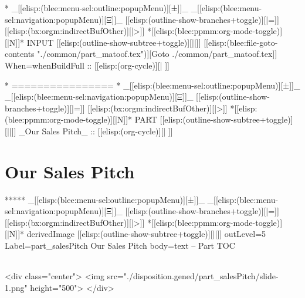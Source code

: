 \begin{whenOrg}
\begin{whenOrg}
*  _[[elisp:(blee:menu-sel:outline:popupMenu)][±]]_ _[[elisp:(blee:menu-sel:navigation:popupMenu)][Ξ]]_ [[elisp:(outline-show-branches+toggle)][|=]] [[elisp:(bx:orgm:indirectBufOther)][|>]] *[[elisp:(blee:ppmm:org-mode-toggle)][|N]]*  INPUT      [[elisp:(outline-show-subtree+toggle)][||]]   [[elisp:(blee:file-goto-contents "./common/part_matoof.tex")][Goto ./common/part_matoof.tex]] When=whenBuildFull ::  [[elisp:(org-cycle)][| ]]
\end{whenOrg}
\begin{whenBuildFull}

\end{whenBuildFull}


\begin{whenOrg}
*      ================
*  _[[elisp:(blee:menu-sel:outline:popupMenu)][±]]_ _[[elisp:(blee:menu-sel:navigation:popupMenu)][Ξ]]_ [[elisp:(outline-show-branches+toggle)][|=]] [[elisp:(bx:orgm:indirectBufOther)][|>]] *[[elisp:(blee:ppmm:org-mode-toggle)][|N]]*  PART       [[elisp:(outline-show-subtree+toggle)][||]]   _Our Sales Pitch_ ::  [[elisp:(org-cycle)][| ]]
\end{whenOrg}

\newpage
\part{Our Sales Pitch}


\begin{whenOrg}
*****  _[[elisp:(blee:menu-sel:outline:popupMenu)][±]]_ _[[elisp:(blee:menu-sel:navigation:popupMenu)][Ξ]]_ [[elisp:(outline-show-branches+toggle)][|=]] [[elisp:(bx:orgm:indirectBufOther)][|>]] *[[elisp:(blee:ppmm:org-mode-toggle)][|N]]*  derivedImage [[elisp:(outline-show-subtree+toggle)][||]] outLevel=5 Label=part_salesPitch Our Sales Pitch body=text -- Part TOC
\end{whenOrg}

\begin{htmlonly}

\begin{frame}[fragile,plain,label=part_salesPitch]
    \frametitle{}
    \framesubtitle{}
    \begin{rawhtml}
<div class="center">
<img src="./disposition.gened/part_salesPitch/slide-1.png" height="500">
</div>
    \end{rawhtml}
\end{frame}
\end{htmlonly}


\end{whenOrg}
